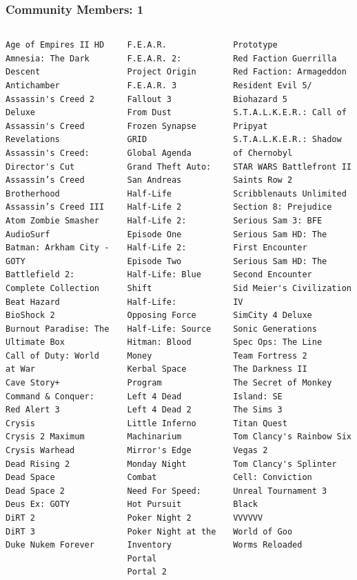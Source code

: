 \documentclass[18pt,xcolor=table]{beamer} \usefonttheme[onlymath]{serif}
\begin{document}
\begin{frame}[fragile]
  \frametitle{Community Members: 1}
  \centering
{\fontsize{5}{4}\selectfont
\begin{columns}[T]
\begin{lstlisting}
Age of Empires II HD
Amnesia: The Dark Descent
Antichamber
Assassin's Creed 2 Deluxe
Assassin's Creed Revelations
Assassin's Creed: Director's Cut
Assassin’s Creed Brotherhood
Assassin’s Creed III
Atom Zombie Smasher
AudioSurf
Batman: Arkham City - GOTY
Battlefield 2: Complete Collection
Beat Hazard
BioShock 2
Burnout Paradise: The Ultimate Box
Call of Duty: World at War
Cave Story+
Command & Conquer: Red Alert 3
Crysis
Crysis 2 Maximum
Crysis Warhead
Dead Rising 2
Dead Space
Dead Space 2
Deus Ex: GOTY
DiRT 2
DiRT 3
Duke Nukem Forever
\end{lstlisting}
\begin{lstlisting}
F.E.A.R.
F.E.A.R. 2: Project Origin
F.E.A.R. 3
Fallout 3
From Dust
Frozen Synapse
GRID
Global Agenda
Grand Theft Auto: San Andreas
Half-Life
Half-Life 2
Half-Life 2: Episode One
Half-Life 2: Episode Two
Half-Life: Blue Shift
Half-Life: Opposing Force
Half-Life: Source
Hitman: Blood Money
Kerbal Space Program
Left 4 Dead
Left 4 Dead 2
Little Inferno
Machinarium
Mirror's Edge
Monday Night Combat
Need For Speed: Hot Pursuit
Poker Night 2
Poker Night at the Inventory
Portal
Portal 2
\end{lstlisting}
\begin{lstlisting}
Prototype
Red Faction Guerrilla
Red Faction: Armageddon
Resident Evil 5/ Biohazard 5
S.T.A.L.K.E.R.: Call of Pripyat
S.T.A.L.K.E.R.: Shadow of Chernobyl
STAR WARS Battlefront II
Saints Row 2
Scribblenauts Unlimited
Section 8: Prejudice
Serious Sam 3: BFE
Serious Sam HD: The First Encounter
Serious Sam HD: The Second Encounter
Sid Meier's Civilization IV
SimCity 4 Deluxe
Sonic Generations
Spec Ops: The Line
Team Fortress 2
The Darkness II
The Secret of Monkey Island: SE
The Sims 3
Titan Quest
Tom Clancy's Rainbow Six Vegas 2
Tom Clancy's Splinter Cell: Conviction
Unreal Tournament 3 Black
VVVVVV
World of Goo
Worms Reloaded
\end{lstlisting}
\end{columns}
} %
\end{frame}
\end{document}
